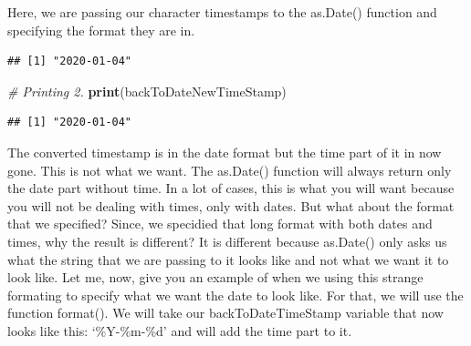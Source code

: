 \documentclass[]{book}
\newenvironment{Shaded}{\begin{snugshade}}{\end{snugshade}}
\newcommand{\CommentTok}[1]{\textcolor[rgb]{0.56,0.35,0.01}{\textit{#1}}}
\newcommand{\DataTypeTok}[1]{\textcolor[rgb]{0.13,0.29,0.53}{#1}}
\newcommand{\KeywordTok}[1]{\textcolor[rgb]{0.13,0.29,0.53}{\textbf{#1}}}
\newcommand{\NormalTok}[1]{#1}
\newcommand{\StringTok}[1]{\textcolor[rgb]{0.31,0.60,0.02}{#1}}
\begin{document}
Here, we are passing our character timestamps to the as.Date() function and specifying the format they are in.

\begin{Shaded}
\end{Shaded}

\begin{verbatim}
## [1] "2020-01-04"
\end{verbatim}

\begin{Shaded}
\begin{Highlighting}[]
\CommentTok{# Printing 2.}
\KeywordTok{print}\NormalTok{(backToDateNewTimeStamp)}
\end{Highlighting}
\end{Shaded}

\begin{verbatim}
## [1] "2020-01-04"
\end{verbatim}

The converted timestamp is in the date format but the time part of it in now gone. This is not what we want. The as.Date() function will always return only the date part without time. In a lot of cases, this is what you will want because you will not be dealing with times, only with dates. But what about the format that we specified? Since, we specidied that long format with both dates and times, why the result is different? It is different because as.Date() only asks us what the string that we are passing to it looks like and not what we want it to look like. Let me, now, give you an example of when we using this strange formating to specify what we want the date to look like. For that, we will use the function format(). We will take our backToDateTimeStamp variable that now looks like this: `\%Y-\%m-\%d' and will add the time part to it.

\begin{Shaded}
\end{Shaded}
\end{document}
